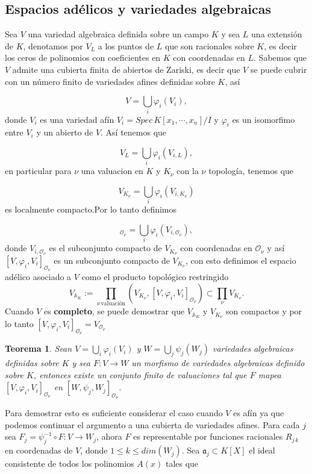 \documentclass[letterpaper]{report}
\newtheorem{teorema}{Teorema}[chapter]
\newcommand{\dem}{{\sc Demostraci\'on. }}
\newcommand{\Oan}{\ensuremath{\mathcal{O}}}
\newcommand{\Ad}{\ensuremath{\mathbb{A}}}
\newcommand{\specKn}{\ensuremath{Spec\,K[x_1,\cdots ,x_n]}}
\begin{document}
\subsection{Espacios adélicos y variedades algebraicas}

\noindent Sea $V$ una variedad algebraica definida sobre un campo $K$ y sea $L$ una extensión de $K$, denotamos por $V_L$ a los puntos de $L$  que son racionales sobre $K$, es decir los ceros de polinomios con coeficientes en $K$ con coordenadas en $L$. Sabemos que $V$ admite una cubierta finita de abiertos de Zariski, es decir que $V$ se puede cubrir con un número finito de variedades afines definidas sobre $K$, así

$$V=\bigcup_i\varphi_i(V_i),$$  
\noindent donde $V_i$ es una variedad afín $V_i=\specKn/I$ y $\varphi_i$ es un isomorfimo entre $V_i$ y un abierto de $V$. Así tenemos que

$$V_L=\bigcup_i\varphi_i(V_{i,L}),$$
\noindent en particular para $\nu$ una valuacion en $K$ y $K_{\nu}$ con la $\nu$ topología, tenemos que 

$$V_{K_{\nu}}=\bigcup_i\varphi_i(V_{i,K_{\nu}})$$
\noindent es localmente compacto.Por lo tanto  definimos

\begin{equation}
	[V,\varphi_i,V_i]_{\Oan_{\nu}}=\bigcup_i\varphi_i(V_{i,\Oan_{\nu}}),
\end{equation} 
\noindent donde $V_{i,\Oan_{\nu}}$ es el subconjunto compacto de $V_{K_{\nu}}$ con coordenadas en $\Oan_{\nu}$ y así $[V,\varphi_i,V_i]_{\Oan_{\nu}}$ es un subconjunto compacto de $V_{K_{\nu}}$, con esto definimos el espacio adélico asociado a $V$ como el producto topológico restringido
\begin{equation}
	V_{\Ad_{K}}:=\prod_{\nu\,\text{valuación}}(V_{K_{\nu}},[V,\varphi_i,V_i]_{\Oan_{\nu}})\subset\prod_{\nu}V_{K_{\nu}}.
\end{equation}
Cuando $V$ es \textbf{completo}, se puede demostrar que $V_{\Ad_{K}}$ y $V_{K_{\nu}}$ son compactos y por lo tanto $[V,\varphi_i,V_i]_{\Oan_{\nu}}=V_{\Oan_{\nu}}$

\begin{teorema}\label{morf_adel}
Sean $V=\bigcup_i \varphi_i(V_i)$ y $W=\bigcup_j \psi_j(W_j)$ variedades algebraicas definidas sobre $K$ y sea $F:V\rightarrow W$ un morfismo de variedades algebraicas definido sobre $K$, entonces existe un conjunto finito de valuaciones tal que $F$ mapea $[V,\varphi_i,V_i]_{\Oan_{\nu}}$ en $[W,\psi_j,W_j]_{\Oan_{\nu}}$. 
\end{teorema}
\noindent\dem Para demostrar esto es suficiente considerar el caso cuando $V$ es afín ya que podemos continuar el argumento a una cubierta de variedades afines. Para cada $j$ sea \hbox{$F_j=\psi^{-1}_j\circ F:V\rightarrow W_j$}, ahora $F$ es representable por funciones racionales $R_{j\,k}$ en coordenadas de $V$, donde $1\leq k\leq dim(W_j)$. Sea $\mathfrak{a}_j\subset K[X]$ el ideal consistente de todos los polinomios $A(x)$ tales que
\end{document}
